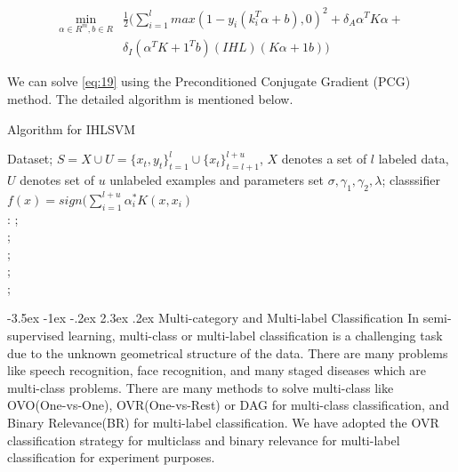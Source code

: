 \documentclass[12pt,a4paper,oneside,english]{report}
\makeatletter
\renewcommand\section{\@startsection {section}{1}{\z@}%
                                   {-3.5ex \@plus -1ex \@minus -.2ex}%
                                   {2.3ex \@plus.2ex}%
                                   {\centering\normalfont\LARGE\bfseries}}
\makeatother
\begin{document}
\begin{equation}\label{eq:19}
\begin{split}
   \underset{\alpha \in R^m,b \in R}{\mathrm{min}}  & \frac{1}{2}(\sum_{i=1}^l max(1-y_i(k_i^T\alpha + b),0)^2 + \delta_A\alpha^TK\alpha + \\ & \delta_I(\alpha^TK + 1^Tb)(IHL)(K\alpha + 1b)) 
\end{split}
\end{equation}


We can solve \eqref{eq:19} using the Preconditioned Conjugate Gradient (PCG) method\cite{melacci2011laplacian}. The detailed algorithm is mentioned below.

\begin{algorithm}
	\caption{Algorithm for IHLSVM}
		\renewcommand{\algorithmicrequire}{\textbf{Input:}}
		\renewcommand{\algorithmicensure}{\textbf{Output:}}
		 Dataset; $S=X\cup U=\{x_t,y_t\}_{t=1}^l\cup \{x_t\}_{t=l+1}^{l+u}$, $X$ denotes a set of $l$ labeled data, $U$ denotes set of $u$ unlabeled examples and parameters set $\sigma , \gamma_1, \gamma_2, \lambda$;
		classsifier $f(x)= sign(\sum_{i=1}^{l+u} \alpha_i^*K(x,x_i)$
		\\ :
		;
		\\   ;\\
		 ;\\
		 ;\\
		 ;
\end{algorithm}




\section{Multi-category and Multi-label Classification}  
In semi-supervised learning, multi-class or multi-label classification is a challenging task due to the unknown geometrical structure of the data. There are many problems like speech recognition\cite{jin2017performance}, face recognition\cite{wei2011face}, and many staged diseases which are multi-class problems. There are many methods to solve multi-class like OVO(One-vs-One)\cite{galar2015drcw}, OVR(One-vs-Rest)\cite{rifkin2004defense} or DAG for multi-class classification\cite{platt1999large}, and Binary Relevance(BR)\cite{zhang2018binary} for multi-label classification. We have adopted the OVR classification strategy for multiclass and binary relevance for multi-label classification for experiment purposes.
\end{document}
